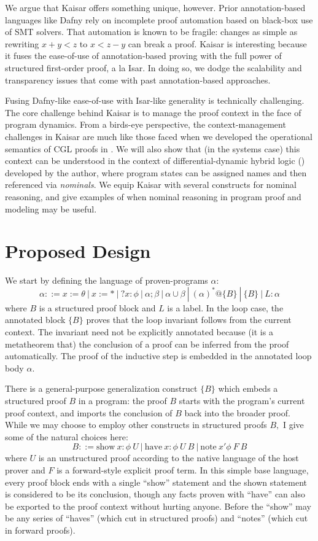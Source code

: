 \documentclass[12pt]{cmuthesis}
\theoremstyle{definition}
\theoremstyle{remark}
\newcommand{\rref}[2][]{\prettyref{#2}}
\newcommand{\CGL}{\textsf{CGL}\xspace}
\begin{document}
We argue that Kaisar offers something unique, however.
Prior annotation-based languages like Dafny rely on incomplete proof automation based on black-box use of SMT solvers.
That automation is known to be fragile: changes as simple as rewriting $x + y < z$ to $x < z - y$ can break a proof.
Kaisar is interesting because it fuses the ease-of-use of annotation-based proving with the full power of structured first-order proof, a la Isar.
In doing so, we dodge the scalability and transparency issues that come with past annotation-based approaches.

Fusing Dafny-like ease-of-use with Isar-like generality is technically challenging.
The core challenge behind Kaisar is to manage the proof context in the face of program dynamics.
From a birds-eye perspective, the context-management challenges in Kaisar are much like those faced when we developed the operational semantics of \CGL proofs in \rref{ch:cgl}.
We will also show that (in the systems case) this context can be understood in the context of differential-dynamic hybrid logic (\dHL) developed by the author, where program states can be assigned names and then referenced via \emph{nominals}.
We equip Kaisar with several constructs for nominal reasoning, and give examples of when nominal reasoning in program proof and modeling may be useful.


\section{Proposed Design}
We start by defining the language of proven-programs $\alpha$:
\[\alpha ::= x{:=}\theta\ |\ x{:=}*\ |\ ?x:\phi\ |\ \alpha;\beta\ |\ \alpha\cup\beta\ |\ (\alpha)^*@\{B\}\ |\ \{B\}\ |\ L: \alpha\]
where $B$ is a structured proof block and $L$ is a label.
In the loop case, the annotated block $\{B\}$ proves that the loop invariant follows from the current context.
The invariant need not be explicitly annotated because (it is a metatheorem that) the conclusion of a proof can be inferred from the proof automatically.
The proof of the inductive step is embedded in the annotated loop body $\alpha$.

There is a general-purpose generalization construct $\{B\}$ which embeds a structured proof $B$ in a program: the proof $B$ starts with the program's current proof context, and imports the conclusion of $B$ back into the broader proof.
While we may choose to employ other constructs in structured proofs $B,$ I give some of the natural choices here:
\[B ::= \text{show}~x:\phi~U\ |\ \text{have}~x:\phi~U~B\ |\ \text{note}~x'\phi~F~B\]
where $U$ is an unstructured proof according to the native language of the host prover and $F$ is a forward-style explicit proof term.
In this simple base language, every proof block ends with a single ``show'' statement and the shown statement is considered to be its conclusion, though any facts proven with ``have'' can also be exported to the proof context without hurting anyone.
Before the ``show'' may be any series of ``haves'' (which cut in structured proofs) and ``notes'' (which cut in forward proofs).
\end{document}
